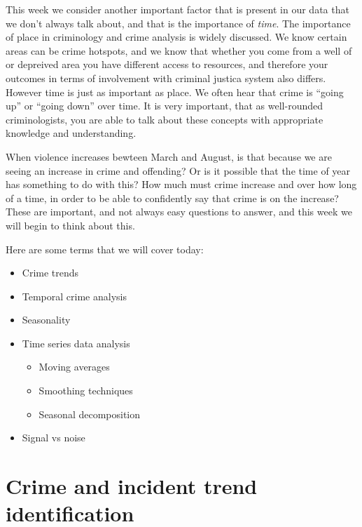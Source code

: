 \documentclass[]{book}
\providecommand{\tightlist}{%
  \setlength{\itemsep}{0pt}\setlength{\parskip}{0pt}}
\theoremstyle{definition}
\theoremstyle{definition}
\theoremstyle{definition}
\theoremstyle{remark}
\begin{document}
This week we consider another important factor that is present in our
data that we don't always talk about, and that is the importance of
\emph{time}. The importance of place in criminology and crime analysis
is widely discussed. We know certain areas can be crime hotspots, and we
know that whether you come from a well of or depreived area you have
different access to resources, and therefore your outcomes in terms of
involvement with criminal justica system also differs. However time is
just as important as place. We often hear that crime is ``going up'' or
``going down'' over time. It is very important, that as well-rounded
criminologists, you are able to talk about these concepts with
appropriate knowledge and understanding.

When violence increases bewteen March and August, is that because we are
seeing an increase in crime and offending? Or is it possible that the
time of year has something to do with this? How much must crime increase
and over how long of a time, in order to be able to confidently say that
crime is on the increase? These are important, and not always easy
questions to answer, and this week we will begin to think about this.

Here are some terms that we will cover today:

\begin{itemize}
\tightlist
\item
  Crime trends
\item
  Temporal crime analysis
\item
  Seasonality
\item
  Time series data analysis

  \begin{itemize}
  \tightlist
  \item
    Moving averages
  \item
    Smoothing techniques
  \item
    Seasonal decomposition
  \end{itemize}
\item
  Signal vs noise
\end{itemize}

\hypertarget{crime-and-incident-trend-identification}{%
\section{Crime and incident trend
identification}\label{crime-and-incident-trend-identification}}
\end{document}
